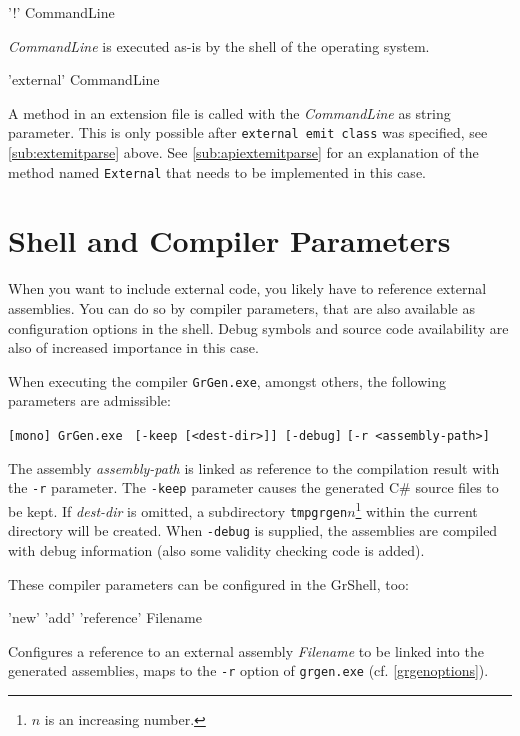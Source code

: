 \begin{rail}
  '!' CommandLine
\end{rail}
\emph{CommandLine} is executed as-is by the shell of the operating system.

\begin{rail}
  'external' CommandLine
\end{rail}
A method in an extension file is called with the \emph{CommandLine} as string parameter.
This is only possible after \texttt{external emit class} was specified, see \ref{sub:extemitparse} above.
See \ref{sub:apiextemitparse} for an explanation of the method named \texttt{External} that needs to be implemented in this case.

\section{Shell and Compiler Parameters}

When you want to include external code, you likely have to reference external assemblies.
You can do so by compiler parameters, that are also available as configuration options in the shell.
Debug symbols and source code availability are also of increased importance in this case.

When executing the compiler \texttt{GrGen.exe}, amongst others, the following parameters are admissible:

\noindent \texttt{[mono] GrGen.exe } \texttt{[-keep [<dest-dir>]] [-debug]} \texttt{[-r <assembly-path>]}

The assembly \emph{assembly-path} is linked as reference to the compilation result with the \texttt{-r} parameter.
The \texttt{-keep} parameter causes the generated C\# source files to be kept. If \emph{dest-dir} is omitted, a subdirectory \texttt{tmpgrgen$n$}\footnote{$n$ is an increasing number.} within the current directory will be created. 
When \texttt{-debug} is supplied, the assemblies are compiled with debug information (also some validity checking code is added).

These compiler parameters can be configured in the GrShell, too:
\begin{rail}
  'new' 'add' 'reference' Filename
\end{rail}
Configures a reference to an external assembly \emph{Filename} to be linked into the generated assemblies, maps to the \texttt{-r} option of \texttt{grgen.exe} (cf. \ref{grgenoptions}).

